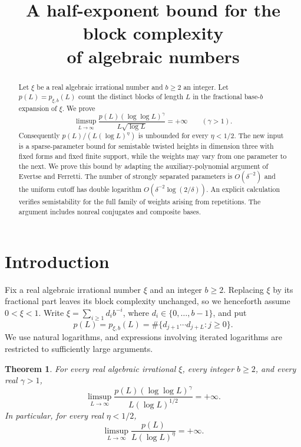 \documentclass[11pt]{article}
\title{A half-exponent bound for the block complexity\\of algebraic numbers}
\author{}\date{}
\numberwithin{equation}{section}
\newtheorem{theorem}{Theorem}[section]
\theoremstyle{remark}\newtheorem{remark}[theorem]{Remark}
\begin{document}
\maketitle
\begin{abstract}
Let $\xi$ be a real algebraic irrational number and $b\ge2$ an integer.
Let $p(L)=p_{\xi,b}(L)$ count the distinct blocks of length $L$ in the
fractional base-$b$ expansion of $\xi$. We prove
\[
 \limsup_{L\to\infty}
 \frac{p(L)(\log\log L)^\gamma}{L\sqrt{\log L}}=+\infty
 \qquad(\gamma>1).
\]
Consequently $p(L)/(L(\log L)^\eta)$ is unbounded for every $\eta<1/2$.
The new input is a sparse-parameter bound for semistable twisted heights
in dimension three with fixed forms and fixed finite support, while the
weights may vary from one parameter to the next. We prove this bound by
adapting the auxiliary-polynomial argument of Evertse and Ferretti.
The number of strongly separated parameters is $O(\delta^{-2})$ and
the uniform cutoff has double logarithm
$O(\delta^{-2}\log(2/\delta))$. An explicit calculation verifies
semistability for the full family of weights arising from repetitions.
The argument includes nonreal conjugates and composite bases.
\end{abstract}

\section{Introduction}
Fix a real algebraic irrational number $\xi$ and an integer $b\ge2$.
Replacing $\xi$ by its fractional part leaves its block complexity
unchanged, so we henceforth assume $0<\xi<1$.
Write $\xi=\sum_{i\ge1}d_ib^{-i}$, where $d_i\in\{0,\ldots,b-1\}$, and put
\[
 p(L)=p_{\xi,b}(L)=\#\{d_{j+1}\cdots d_{j+L}:j\ge0\}.
\]
We use natural logarithms, and expressions involving iterated logarithms
are restricted to sufficiently large arguments.

\begin{theorem}\label{thm:main}
For every real algebraic irrational $\xi$, every integer $b\ge2$,
and every real $\gamma>1$,
\begin{equation}\label{eq:main}
 \limsup_{L\to\infty}
 \frac{p(L)(\log\log L)^\gamma}{L(\log L)^{1/2}}=+\infty.
\end{equation}
In particular, for every real $\eta<1/2$,
\begin{equation}\label{eq:eta}
 \limsup_{L\to\infty}\frac{p(L)}{L(\log L)^\eta}=+\infty.
\end{equation}
\end{theorem}
\end{document}
